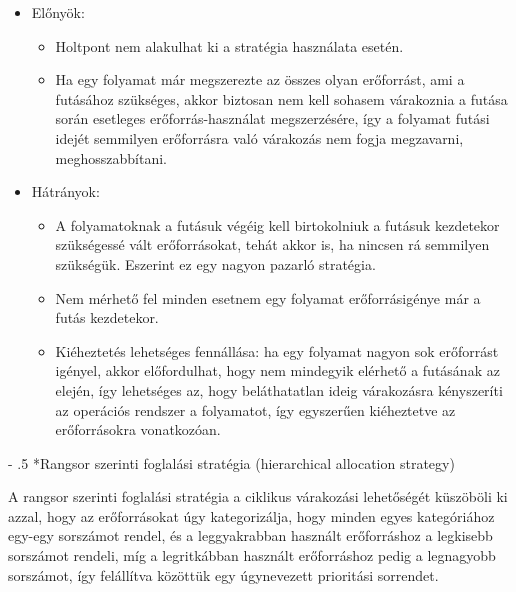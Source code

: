 \documentclass[tikz,12pt,margin=0px]{article}
\makeatletter
\renewcommand\paragraph{%
	\@startsection{paragraph}{4}{0mm}%
	{-\baselineskip}%
	{.5\baselineskip}%
	{\normalfont\normalsize\bfseries}}
\makeatother
\begin{document}
    \begin{itemize}[topsep=8pt,itemsep=4pt,partopsep=4pt, parsep=4pt]
        \item Előnyök:
        \begin{itemize}
            \item Holtpont nem alakulhat ki a stratégia használata esetén.
            \item Ha egy folyamat már megszerezte az összes olyan erőforrást, ami a futásához szükséges, akkor biztosan nem kell sohasem várakoznia a futása során esetleges erőforrás-használat megszerzésére, így a folyamat futási idejét semmilyen erőforrásra való várakozás nem fogja megzavarni, meghosszabbítani.
        \end{itemize}
\newpage
        \item Hátrányok:
        \begin{itemize}
            \item A folyamatoknak a futásuk végéig kell birtokolniuk a futásuk kezdetekor szükségessé vált erőforrásokat, tehát akkor is, ha nincsen rá semmilyen szükségük. Eszerint ez egy nagyon pazarló stratégia.
            \item Nem mérhető fel minden esetnem egy folyamat erőforrásigénye már a futás kezdetekor.
            \item Kiéheztetés lehetséges fennállása: ha egy folyamat nagyon sok erőforrást igényel, akkor előfordulhat, hogy nem mindegyik elérhető a futásának az elején, így lehetséges az, hogy beláthatatlan ideig várakozásra kényszeríti az operációs rendszer a folyamatot, így egyszerűen kiéheztetve az erőforrásokra vonatkozóan.
        \end{itemize}
    \end{itemize}

    \paragraph*{Rangsor szerinti foglalási stratégia (hierarchical allocation strategy)}

    \noindent A rangsor szerinti foglalási stratégia a ciklikus várakozási lehetőségét küszöböli ki azzal, hogy az erőforrásokat úgy kategorizálja, hogy minden egyes kategóriához egy-egy sorszámot rendel, és a leggyakrabban használt erőforráshoz a legkisebb sorszámot rendeli, míg a legritkábban használt erőforráshoz pedig a legnagyobb sorszámot, így felállítva közöttük egy úgynevezett prioritási sorrendet.\\
\end{document}
